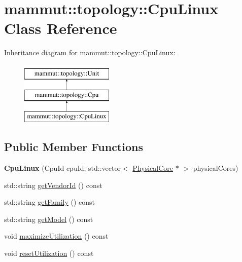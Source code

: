 \hypertarget{classmammut_1_1topology_1_1CpuLinux}{\section{mammut\-:\-:topology\-:\-:Cpu\-Linux Class Reference}
\label{classmammut_1_1topology_1_1CpuLinux}
}
Inheritance diagram for mammut\-:\-:topology\-:\-:Cpu\-Linux\-:\begin{figure}[H]
\begin{center}
\leavevmode
\includegraphics[height=3.000000cm]{classmammut_1_1topology_1_1CpuLinux}
\end{center}
\end{figure}
\subsection*{Public Member Functions}
\begin{DoxyCompactItemize}
\item 
\hypertarget{classmammut_1_1topology_1_1CpuLinux_a2cbd102ef72df0716ba11029e9bd4d8f}{{\bfseries Cpu\-Linux} (Cpu\-Id cpu\-Id, std\-::vector$<$ \hyperlink{classmammut_1_1topology_1_1PhysicalCore}{Physical\-Core} $\ast$ $>$ physical\-Cores)}\label{classmammut_1_1topology_1_1CpuLinux_a2cbd102ef72df0716ba11029e9bd4d8f}

\item 
std\-::string \hyperlink{classmammut_1_1topology_1_1CpuLinux_a95f8d7d4f1d8fc23a4e3c0a7b7879be1}{get\-Vendor\-Id} () const 
\item 
std\-::string \hyperlink{classmammut_1_1topology_1_1CpuLinux_af6d293f96505b4269d0e763588ec538f}{get\-Family} () const 
\item 
std\-::string \hyperlink{classmammut_1_1topology_1_1CpuLinux_ad1fe33a16052441fd0ed67734452b984}{get\-Model} () const 
\item 
void \hyperlink{classmammut_1_1topology_1_1CpuLinux_a428a9356fce899f82494f0973201f009}{maximize\-Utilization} () const 
\item 
void \hyperlink{classmammut_1_1topology_1_1CpuLinux_ae22825c9a86f221c3ffe9c456dfe96aa}{reset\-Utilization} () const 
\end{DoxyCompactItemize}
